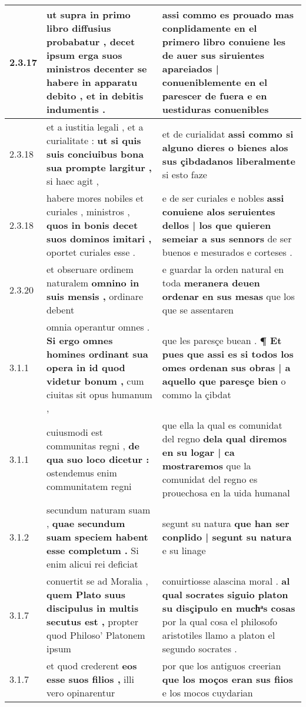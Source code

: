 \begin{tabular}{|p{1cm}|p{6.5cm}|p{6.5cm}|}
2.3.17 & ut supra in primo libro diffusius probabatur , \textbf{ decet ipsum erga suos ministros decenter se habere in apparatu debito , } et in debitis indumentis . & assi commo es prouado mas conplidamente en el primero libro \textbf{ conuiene les de auer sus siruientes apareiados | conueniblemente en el parescer de fuera } e en uestiduras conuenibles \\\hline
2.3.18 & et a iustitia legali , et a curialitate : \textbf{ ut si quis suis conciuibus bona sua prompte largitur , } si haec agit , & et de curialidat \textbf{ assi commo si alguno dieres o bienes alos sus çibdadanos liberalmente } si esto faze \\\hline
2.3.18 & habere mores nobiles et curiales , ministros , \textbf{ quos in bonis decet suos dominos imitari , } oportet curiales esse . & e de ser curiales e nobles \textbf{ assi conuiene alos seruientes dellos | los que quieren semeiar a sus sennors } de ser buenos e mesurados e corteses . \\\hline
2.3.20 & et obseruare ordinem naturalem \textbf{ omnino in suis mensis , } ordinare debent & e guardar la orden natural en toda \textbf{ meranera deuen ordenar en sus mesas } que los que se assentaren \\\hline
3.1.1 & omnia operantur omnes . \textbf{ Si ergo omnes homines ordinant sua opera in id quod videtur bonum , } cum ciuitas sit opus humanum , & que les paresçe buean . \textbf{ ¶ Et pues que assi es si todos los omes ordenan sus obras | a aquello que paresçe bien } o commo la çibdat \\\hline
3.1.1 & cuiusmodi est communitas regni , \textbf{ de qua suo loco dicetur : } ostendemus enim communitatem regni & que ella la qual es comunidat del regno \textbf{ dela qual diremos en su logar | ca mostraremos } que la comunidat del regno es prouechosa en la uida humanal \\\hline
3.1.2 & secundum naturam suam , \textbf{ quae secundum suam speciem habent esse completum . } Si enim alicui rei deficiat & segunt su natura \textbf{ que han ser conplido | segunt su natura } e su linage \\\hline
3.1.7 & conuertit se ad Moralia , \textbf{ quem Plato suus discipulus in multis secutus est , } propter quod Philoso’ Platonem ipsum & conuirtiosse alascina moral . \textbf{ al qual socrates siguio platon su disçipulo en muchͣs cosas } por la qual cosa el philosofo aristotiles llamo a platon el segundo socrates . \\\hline
3.1.7 & et quod crederent \textbf{ eos esse suos filios , } illi vero opinarentur & por que los antiguos creerian \textbf{ que los moços eran sus fiios } e los mocos cuydarian \\\hline

\end{tabular}
